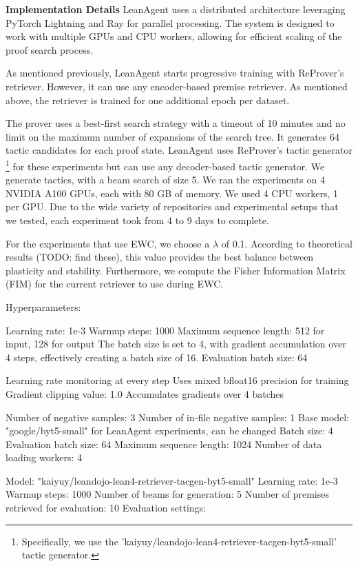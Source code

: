 \documentclass{article} %
\begin{document}
\textbf{Implementation Details} LeanAgent uses a distributed architecture leveraging PyTorch Lightning and Ray for parallel processing. The system is designed to work with multiple GPUs and CPU workers, allowing for efficient scaling of the proof search process.

As mentioned previously, LeanAgent starts progressive training with ReProver's retriever. However, it can use any encoder-based premise retriever. As mentioned above, the retriever is trained for one additional epoch per dataset. 

The prover uses a best-first search strategy with a timeout of 10 minutes and no limit on the maximum number of expansions of the search tree. It generates 64 tactic candidates for each proof state. LeanAgent uses ReProver's tactic generator \footnote{Specifically, we use the 'kaiyuy/leandojo-lean4-retriever-tacgen-byt5-small' tactic generator.} for these experiments but can use any decoder-based tactic generator. We generate tactics, with a beam search of size 5. We ran the experiments on 4 NVIDIA A100 GPUs, each with 80 GB of memory. We used 4 CPU workers, 1 per GPU. Due to the wide variety of repositories and experimental setups that we tested, each experiment took from 4 to 9 days to complete.

For the experiments that use EWC, we choose a $\lambda$ of 0.1. According to theoretical results (TODO: find these), this value provides the best balance between plasticity and stability. Furthermore, we compute the Fisher Information Matrix (FIM) for the current retriever to use during EWC. 

Hyperparameters:

Learning rate: 1e-3
Warmup steps: 1000
Maximum sequence length: 512 for input, 128 for output
The batch size is set to 4, with gradient accumulation over 4 steps, effectively creating a batch size of 16.
Evaluation batch size: 64

Learning rate monitoring at every step
Uses mixed bfloat16 precision for training
Gradient clipping value: 1.0
Accumulates gradients over 4 batches

Number of negative samples: 3
Number of in-file negative samples: 1
Base model: "google/byt5-small" for LeanAgent experiments, can be changed
Batch size: 4
Evaluation batch size: 64
Maximum sequence length: 1024
Number of data loading workers: 4

Model: "kaiyuy/leandojo-lean4-retriever-tacgen-byt5-small"
Learning rate: 1e-3
Warmup steps: 1000
Number of beams for generation: 5
Number of premises retrieved for evaluation: 10
Evaluation settings:
\end{document}
